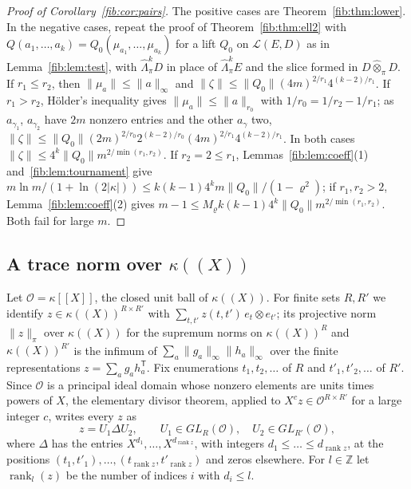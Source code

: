 \documentclass[11pt]{amsart}
\theoremstyle{definition}
\theoremstyle{remark}
\numberwithin{equation}{section}
\newcommand{\Z}{\mathbb Z}
\newcommand{\cL}{\mathcal L}
\newcommand{\abs}[1]{\lvert #1\rvert}
\newcommand{\norm}[1]{\lVert #1\rVert}
\newcommand{\rank}{\operatorname{rank}}
\theoremstyle{plain}
\theoremstyle{definition}
\theoremstyle{plain}
\begin{document}
\begin{proof}[Proof of Corollary~\ref{fib:cor:pairs}]
The positive cases are Theorem~\ref{fib:thm:lower}. In the negative cases, repeat the proof of
Theorem~\ref{fib:thm:ell2} with $Q(a_1,\dots,a_k)=Q_0(\mu_{a_1},\dots,\mu_{a_k})$ for a lift $Q_0$ on $\cL(E,D)$ as in
Lemma~\ref{fib:lem:test}, with $\widehat\Lambda^k_\pi D$ in place of $\widehat\Lambda^k_\pi E$ and the slice formed in
$D\widehat\otimes_\pi D$. If $r_1\le r_2$, then $\norm{\mu_a}\le\norm a_\infty$ and
$\norm\zeta\le\norm{Q_0}(4m)^{2/r_1}4^{(k-2)/r_1}$. If $r_1>r_2$, H\"older's inequality gives
$\norm{\mu_a}\le\norm a_{r_0}$ with $1/r_0=1/r_2-1/r_1$; as $a_{\gamma_1}$, $a_{\gamma_2}$ have $2m$ nonzero entries and
the other $a_\gamma$ two, $\norm\zeta\le\norm{Q_0}(2m)^{2/r_0}2^{(k-2)/r_0}(4m)^{2/r_1}4^{(k-2)/r_1}$. In both cases
$\norm\zeta\le4^k\norm{Q_0}m^{2/\min(r_1,r_2)}$. If $r_2=2\le r_1$, Lemmas~\ref{fib:lem:coeff}(1)
and~\ref{fib:lem:tournament} give $m\ln m/(1+\ln(2\abs\kappa))\le k(k-1)4^km\norm{Q_0}/(1-\varrho^2)$; if $r_1,r_2>2$,
Lemma~\ref{fib:lem:coeff}(2) gives $m-1\le M_\varrho k(k-1)4^k\norm{Q_0}m^{2/\min(r_1,r_2)}$. Both fail for large $m$.
\end{proof}

\subsection{A trace norm over \texorpdfstring{$\kappa((X))$}{a Laurent series field}}\label{frc:ssec:trace}
Let $\mathcal O=\kappa[[X]]$, the closed unit ball of $\kappa((X))$. For finite sets $R,R'$ we identify
$z\in\kappa((X))^{R\times R'}$ with $\sum_{t,t'}z(t,t')\,e_t\otimes e_{t'}$; its projective norm $\norm z_\pi$ over
$\kappa((X))$ for the supremum norms on $\kappa((X))^R$ and $\kappa((X))^{R'}$ is the infimum of
$\sum_a\norm{g_a}_\infty\norm{h_a}_\infty$ over the finite representations $z=\sum_ag_ah_a^{\mathsf T}$. Fix enumerations $t_1,t_2,\dots$ of $R$ and $t'_1,t'_2,\dots$ of $R'$. Since $\mathcal O$ is
a principal ideal domain whose nonzero elements are units times powers of $X$, the elementary divisor theorem, applied to
$X^cz\in\mathcal O^{R\times R'}$ for a large integer $c$, writes every $z$ as
\begin{equation}\label{frc:eq:smith}
 z=U_1\Delta U_2,\qquad U_1\in GL_R(\mathcal O),\quad U_2\in GL_{R'}(\mathcal O),
\end{equation}
where $\Delta$ has the entries $X^{d_1},\dots,X^{d_{\rank z}}$, with integers $d_1\le\dots\le d_{\rank z}$, at the positions
$(t_1,t'_1),\dots,(t_{\rank z},t'_{\rank z})$ and zeros elsewhere. For $l\in\Z$ let $\rank_l(z)$ be the number of indices
$i$ with $d_i\le l$.
\end{document}
